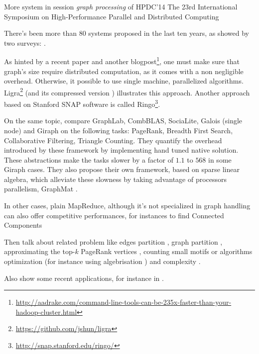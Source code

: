 More system in session \emph{graph processing} of HPDC'14 The 23rd International
Symposium on High-Performance Parallel and Distributed Computing 

There's been more than 80 systems proposed in the last ten years, as showed by
two surveys: \autocites{Doekemeijer2014}{McCune2015}.

As hinted by a recent paper\autocite{COST15} and another
blogpost\footnote{\href{http://aadrake.com/command-line-tools-can-be-235x-faster-than-your-hadoop-cluster.html}%
	{http://aadrake.com/command-line-tools-can-be-235x-faster-than-your-hadoop-cluster.html}},
one must make sure that graph's size require distributed computation, as it
comes with a non negligible overhead. Otherwise, it possible to use single
machine, parallelized algorithms.
Ligra\footnote{\href{https://github.com/jshun/ligra}%
	{https://github.com/jshun/ligra}} \autocite{Ligra13} (and its compressed
version \autocite{Ligra15}) illustrates this approach. Another approach based
on Stanford SNAP software is called Ringo\footnote{\href{http://snap.stanford.edu/ringo/}%
	{http://snap.stanford.edu/ringo/}}\autocite{Ringo15}.

On the same topic, \textcite{NativeBenchmark14} compare GraphLab, CombBLAS,
SociaLite, Galois (single node) and Giraph on the following tasks: PageRank,
Breadth First Search, Collaborative Filtering, Triangle Counting. They quantify
the overhead introduced by these framework by implementing hand tuned native
solution. These abstractions make the tasks slower by a factor of $1.1$ to
$568$ in some Giraph cases. They also propose their own framework, based on
sparse linear algebra, which alleviate these slowness by taking advantage of
processors parallelism, GraphMat \autocite{GraphMat15}.

In other cases, plain MapReduce\autocite{MapReduce04}, although it's not
specialized in graph handling can also offer competitive performances, for
instances to find Connected Components
\autocites{Kardes2014}{Qin2014}{Kiveris2014}

Then talk about related problem like edges partition \autocite{Bourse2014a},
graph partition \autocites{Partition13}{Tsourakakis2014}{Partition14}{Li2015a},
approximating the top-$k$ PageRank vertices \autocite{Mitliagkas2015},
counting small motifs \autocite{Elenberg2015} or
algorithms optimization \autocites{Salihoglu14}{Salihoglu2014b} (for instance
using algebrisation \autocite{Kaski2015}) and complexity
\autocite{ComputationBounds14,Pandurangan2015}.

Also show some recent applications, for instance in \pcc{}
\autocites{Bonchi2012}{Chierichetti2014}.
\autocite{Quick2012}
